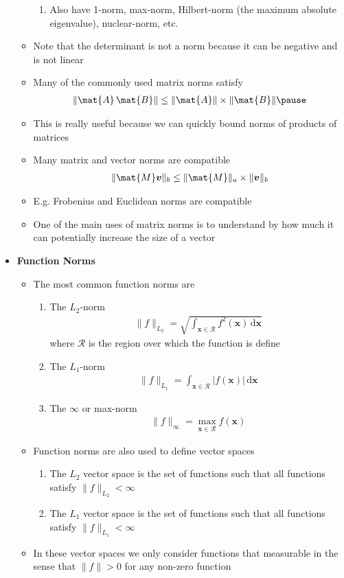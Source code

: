 \documentclass[11pt]{article}
\newcommand{\dd}{\mathrm{d}}
\begin{document}
\begin{itemize}
\begin{itemize}
\begin{enumerate}
\item Also have 1-norm, max-norm, Hilbert-norm (the maximum absolute eigenvalue), nuclear-norm, etc.
\end{enumerate}
\item Note that the determinant is not a norm because it can be negative and is not linear
\item Many of the commonly used matrix norms satisfy
\begin{align*}
   \| \mat{A}\,\mat{B} \| \leq \| \mat{A} \| \times \| \mat{B} \|\pause
\end{align*}
\item This is really useful because we can quickly bound norms of products of matrices
\item Many matrix and vector norms are compatible
\begin{align*}
    \| \mat{M} \bm{v} \|_b \leq \| \mat{M} \|_a \times \| \bm{v} \|_b
 \end{align*}
\item E.g. Frobenius and Euclidean norms are compatible
\item One of the main uses of matrix norms is to understand by how much it
can potentially increase the size of a vector
\end{itemize}
\item \textbf{Function Norms}
\begin{itemize}
\item The most common function norms are
\begin{enumerate}
\item The \(L_2\)-norm
\begin{align*}
\| f \|_{L_2} = \sqrt{\int_{\bm{x}\in\mathcal{R}} f^2(\bm{x}) \, \dd \bm{x}}
\end{align*}
where \(\mathcal{R}\) is the region over which the function is define
\item The \(L_1\)-norm
\begin{align*}
\| f \|_{L_1} = \int_{\bm{x}\in\mathcal{R}} |f(\bm{x})| \, \dd \bm{x}
\end{align*}
\item The \(\infty\) or max-norm
\begin{align*}
\| f \|_{\infty} = \max_{\bm{x}\in\mathcal{R}} f(\bm{x})
\end{align*}
\end{enumerate}
\item Function norms are also used to define vector spaces
\begin{enumerate}
\item The \(L_2\) vector space is the set of functions such that all 
functions satisfy \(\| f \|_{L_2}<\infty\)
\item The \(L_1\) vector space is the set of functions such that all 
functions satisfy \(\| f \|_{L_1}<\infty\)
\end{enumerate}
\item In these vector spaces we only consider functions that measurable in
the sense that \(\|f\|>0\) for any non-zero function
\end{itemize}
\end{itemize}
\end{document}
